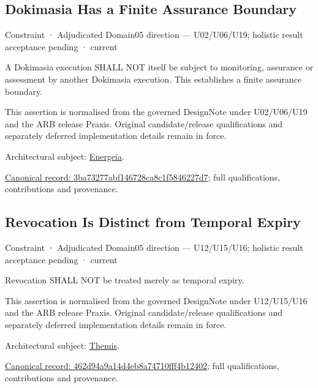\subsection{Dokimasia Has a Finite Assurance Boundary}

\label{element:3ba73277abf146728ca8c1f5846227d7}
{\small Constraint · Adjudicated Domain05 direction — U02/U06/U19; holistic result acceptance pending · current}\par

A Dokimasia execution SHALL NOT itself be subject to monitoring, assurance or assessment by another Dokimasia execution. This establishes a finite assurance boundary.



This assertion is normalised from the governed DesignNote under U02/U06/U19 and the ARB release Praxis. Original candidate/release qualifications and separately deferred implementation details remain in force.



Architectural subject: \hyperref[element:fb3f37a6ac614415ac486a6de9d35994]{Energeia}.


{\footnotesize \href{../../../../continuum/motivation/constraint/3ba73277abf146728ca8c1f5846227d7.md}{Canonical record: 3ba73277abf146728ca8c1f5846227d7}; full qualifications, contributions and provenance.}\par
\subsection{Revocation Is Distinct from Temporal Expiry}

\label{element:462d94a9a14d4eb8a74710fff4b12402}
{\small Constraint · Adjudicated Domain05 direction — U12/U15/U16; holistic result acceptance pending · current}\par

Revocation SHALL NOT be treated merely as temporal expiry.



This assertion is normalised from the governed DesignNote under U12/U15/U16 and the ARB release Praxis. Original candidate/release qualifications and separately deferred implementation details remain in force.



Architectural subject: \hyperref[element:899d34ec491948b68aad09e507dea6d1]{Themis}.


{\footnotesize \href{../../../../continuum/motivation/constraint/462d94a9a14d4eb8a74710fff4b12402.md}{Canonical record: 462d94a9a14d4eb8a74710fff4b12402}; full qualifications, contributions and provenance.}\par
